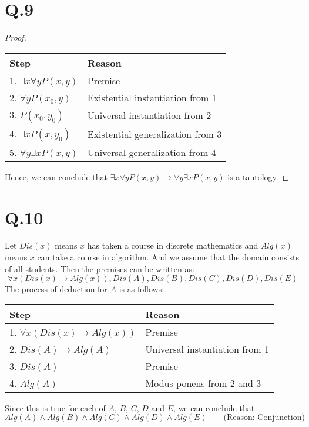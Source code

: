 \documentclass[a4paper,12pt]{article}
\begin{document}
\section*{Q.9}
\begin{proof}
	$ $\\
	\begin{center}
		\begin{tabular}{ll}
			\toprule
			Step & Reason\\
			\midrule
			1. $\exists x \forall y P(x,y)$ & Premise\\
			2. $\forall y P(x_0,y)$ & Existential instantiation from 1\\
			3. $P(x_0,y_0)$ & Universal instantiation from 2\\
			4. $\exists x P(x,y_0)$ & Existential generalization from 3\\
			5. $\forall y \exists x P(x,y)$ & Universal generalization from 4\\
			\bottomrule
		\end{tabular}
	\end{center}
	Hence, we can conclude that $\exists x \forall y P(x,y) \to \forall y \exists x P(x,y)$ is a tautology.
\end{proof}

\section*{Q.10}
Let $Dis(x)$ means $x$ has taken a course in discrete mathematics and $Alg(x)$ means $x$ can take a course in algorithm.
And we assume that the domain consists of all students.
Then the premises can be written as:
\begin{equation*}
	\forall x (Dis(x) \to Alg(x)) , Dis(A) , Dis(B) , Dis(C) , Dis(D) , Dis(E)
\end{equation*}
The process of deduction for $A$ is as follows:
\begin{center}
	\begin{tabular}{ll}
		\toprule
		Step & Reason\\
		\midrule
		1. $\forall x (Dis(x) \to Alg(x))$ & Premise\\
		2. $Dis(A) \to Alg(A)$ & Universal instantiation from 1\\
		3. $Dis(A)$ & Premise\\
		4. $Alg(A)$ & Modus ponens from 2 and 3\\
		\bottomrule
	\end{tabular}
\end{center}
Since this is true for each of $A$, $B$, $C$, $D$ and $E$, we can conclude that
\begin{equation*}
	Alg(A) \wedge Alg(B) \wedge Alg(C) \wedge Alg(D) \wedge Alg(E) \qquad \text{(Reason: Conjunction)}
\end{equation*}
\end{document}
